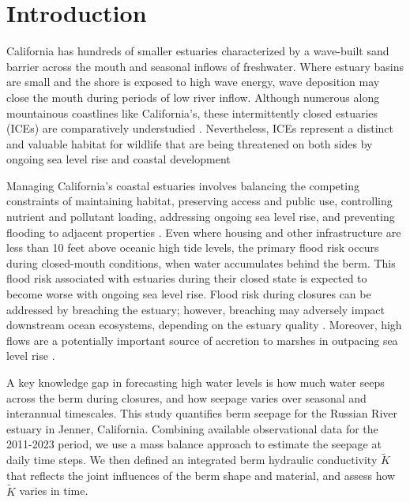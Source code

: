 \documentclass[preprint,12pt,authoryear]{elsarticle}
\begin{document}

%  

\section{Introduction}
\label{sec:intro}


California has hundreds of smaller estuaries characterized by a wave-built sand barrier across the mouth and seasonal inflows of freshwater. 
Where estuary basins are small and the shore is exposed to high wave energy, wave deposition may close the mouth during periods of low river inflow.
Although numerous along mountainous coastlines like California's, these intermittently closed estuaries (ICEs) are comparatively understudied \citep{largier2023recognizing}.
Nevertheless, ICEs represent a distinct and valuable habitat for wildlife
that are being threatened on both sides by ongoing sea level rise and coastal development

Managing California’s coastal estuaries involves balancing the competing constraints of maintaining habitat, preserving access and public use, controlling nutrient and pollutant loading, addressing ongoing sea level rise, and preventing flooding to adjacent properties \cite{thorne2017coastal}.
Even where housing and other infrastructure are less than 10 feet above oceanic high tide levels, the primary flood risk occurs during closed-mouth conditions, when water accumulates behind the berm. 
This flood risk associated with estuaries during their closed state is expected to become worse with ongoing sea level rise.
Flood risk during closures can be addressed by breaching the estuary; however, breaching may adversely impact downstream ocean ecosystems, depending on the estuary quality \cite{slinger2017modes}. Moreover, high flows are a potentially important source of accretion to marshes in outpacing sea level rise \citep{thorne2021wetlands}.

 A key knowledge gap in forecasting high water levels is how much water seeps across the berm during closures, and how seepage varies over seasonal and interannual timescales.
This study quantifies berm seepage for the Russian River estuary in Jenner, California. Combining available observational data for the 2011-2023 period, we use a mass balance approach to estimate the seepage at daily time steps. We then defined an integrated berm hydraulic conductivity $\tilde K$  that reflects the joint influences of the berm shape and material, and assess how $\tilde K$ varies in time.
\end{document}
